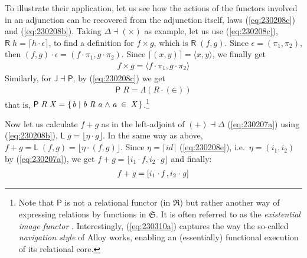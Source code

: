 \documentclass{elsarticle}
\newcommand{\Conid}[1]{\mathit{#1}}
\newcommand{\Varid}[1]{\mathit{#1}}
\def\alt#1#2{\mathopen{[}#1\hskip 1pt,#2\mathclose{]}}
\def\comp{ \mathbin{\cdot} }
\def\fun#1{\mathsf{#1}}
\def\p#1{\pi_{#1}}
\def\conj#1#2{\mathopen{\langle} #1, #2 \mathclose{\rangle}}
\def\cat#1{{\mathfrak #1}}
\begin{document}
To illustrate their application, let us see how the actions of the functors
involved in an adjunction can be recovered from the adjunction itself, laws
(\ref{eq:230208c}) and (\ref{eq:230208b}). Taking \ensuremath{\Delta \mathbin\dashv ( \times )} as example,
let us use (\ref{eq:230208c}), \ensuremath{\fun R \;\Varid{h}\mathrel{=}\lceil \Varid{h} \comp \epsilon \rceil}, to find a definition for
\ensuremath{\Varid{f} \times \Varid{g}}, which is \ensuremath{\fun R \;(\Varid{f},\Varid{g})}. Since \ensuremath{\epsilon \mathrel{=}(\p1,\p2)}, then \ensuremath{(\Varid{f},\Varid{g}) \comp \epsilon \mathrel{=}(\Varid{f} \comp \p1,\Varid{g} \comp \p2)}.
Since \ensuremath{\lceil (\Varid{x},\Varid{y})\rceil\mathrel{=}\conj{\Varid{x}}{\Varid{y}}}, we finally get
\begin{eqnarray}
	\ensuremath{\Varid{f} \times \Varid{g}\mathrel{=}\conj{\Varid{f} \comp \p1}{\Varid{g} \comp \p2}}
\end{eqnarray}
Similarly, for \ensuremath{\fun J \mathbin\dashv \fun P }, by (\ref{eq:230208c}) we get 
\begin{eqnarray}
	\ensuremath{\fun P \;\Conid{R}\mathrel{=}\Lambda{(\Conid{R} \comp (\mathbin\in ))}}
	\label{eq:230310a}
\end{eqnarray}
that is,  \ensuremath{\fun P \;\Conid{R}\;\Conid{X}\mathrel{=}\{\mskip1.5mu \Varid{b}\mid \Varid{b}\;\Conid{R}\;\Varid{a}\mathrel{\wedge}\Varid{a}\;\mathbin\in \;\Conid{X}\mskip1.5mu\}}.\footnote{Note that \ensuremath{\fun P } is not a relational functor (in \ensuremath{\cat{R}}) but rather another way of expressing relations by functions in \ensuremath{\cat{S}}. It is often referred to as the \emph{existential image functor} \cite{BM97}. Interestingly, (\ref{eq:230310a}) captures the way the
so-called \emph{navigation style} of Alloy \cite{Jac12} works, enabling an (essentially) functional
execution of its relational core.}

Now let us calculate \ensuremath{\Varid{f}\mathbin{+}\Varid{g}} as in the left-adjoint of \ensuremath{(\mathbin{+})\mathbin\dashv \Delta } (\ref{eq:230207a}) using
(\ref{eq:230208b}), \ensuremath{\fun L \;\Varid{g}\mathrel{=}\lfloor \eta  \comp \Varid{g}\rfloor}. In the same way as above,
\ensuremath{\Varid{f}\mathbin{+}\Varid{g}\mathrel{=}\fun L \;(\Varid{f},\Varid{g})\mathrel{=}\lfloor \eta  \comp (\Varid{f},\Varid{g})\rfloor}. Since \ensuremath{\eta \mathrel{=}\lceil {id}\rceil} (\ref{eq:230208e}),
i.e.\ \ensuremath{\eta \mathrel{=}(i_1,i_2)} by (\ref{eq:230207a}), we get \ensuremath{\Varid{f}\mathbin{+}\Varid{g}\mathrel{=}\lfloor i_1 \comp \Varid{f},i_2 \comp \Varid{g}\rfloor}
and finally:
\begin{eqnarray}
	\ensuremath{\Varid{f}\mathbin{+}\Varid{g}\mathrel{=}\alt{i_1 \comp \Varid{f}}{i_2 \comp \Varid{g}}}
\end{eqnarray}
\end{document}

